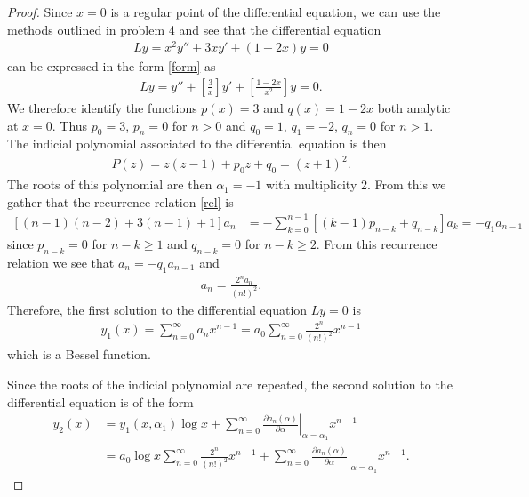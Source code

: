 \documentclass[12pt]{article}
\theoremstyle{definition}
\begin{document}
\begin{proof}
  Since $x=0$ is a regular point of the differential equation, we can use the methods outlined in problem 4 and see that the differential equation
  \begin{align*}
    Ly = x^2y'' + 3xy' + (1-2x)y = 0
  \end{align*}
  can be expressed in the form \eqref{form} as
  \begin{align*}
    Ly = y'' + \left[\frac{3}{x}\right]y' + \left[\frac{1-2x}{x^2}\right]y = 0.
  \end{align*}
  We therefore identify the functions $p(x) = 3$ and $q(x) = 1-2x$ both analytic at $x=0$. Thus
  $p_0 = 3$, $p_n = 0$ for $n>0$ and $q_0 = 1$, $q_1 = -2$, $q_n = 0$ for $n>1$. The indicial polynomial
  associated to the differential equation is then
  \begin{align*}
    P(z) = z(z-1)+p_0z+q_0 = (z+1)^2.
  \end{align*}
  The roots of this polynomial are then $\alpha_1=-1$ with multiplicity 2. From this we gather that the recurrence relation \eqref{rel} is
  \begin{align*}
    \left[(n-1)(n-2) + 3(n-1) +1\right]a_n &= -\sum_{k=0}^{n-1}\left[(k-1)p_{n-k} + q_{n-k}\right]a_k = -q_1a_{n-1}
  \end{align*}
  since $p_{n-k} = 0$ for ${n-k}\geq1$ and $q_{n-k}=0$ for ${n-k}\geq 2$. From this recurrence relation
  we see that $a_n = -q_1a_{n-1}$ and
  \begin{align*}
    a_n = \frac{2^n a_0}{(n!)^2}.
  \end{align*}
  Therefore, the first solution to the differential equation $Ly=0$ is
  \begin{align*}
    y_1(x) = \sum_{n=0}^{\infty} a_nx^{n-1} = a_0 \sum_{n=0}^{\infty} \frac{2^n}{(n!)^2}x^{n-1}
  \end{align*}
  which is a Bessel function.

  Since the roots of the indicial polynomial are repeated, the second solution to the differential equation
  is of the form
  \begin{align*}
    y_2(x) &= y_1(x,\alpha_1)\log x + \sum_{n=0}^{\infty}\left.\frac{\partial a_n(\alpha)}{\partial \alpha}\right|_{\alpha=\alpha_1}x^{n-1} \\
    &= a_0\log x\sum_{n=0}^{\infty} \frac{2^n}{(n!)^2}x^{n-1} + \sum_{n=0}^{\infty}\left.\frac{\partial a_n(\alpha)}{\partial \alpha}\right|_{\alpha=\alpha_1}x^{n-1}.
  \end{align*}


\end{proof}
\end{document}
